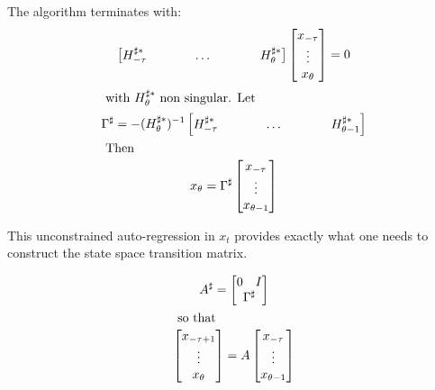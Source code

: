\documentclass{elsart}
\begin{document}

The algorithm terminates with:
\begin{gather}\label{eq:easy}
  \begin{bmatrix}
    \hsh
  \end{bmatrix} 
  \begin{bmatrix}
    x_{-\tau}\\ \vdots \\x_{\theta}
  \end{bmatrix} =0%
   \\ \intertext{ with $H^{\sharp\ast}_{\theta}$ non singular. Let} 
\Gamma^\sharp=-  (H^{\sharp\ast}_{\theta})^{-1}\begin{bmatrix}
    \hshShort
  \end{bmatrix} \\ \intertext{ Then }
x_{\theta} = 
 \Gamma^\sharp
  \begin{bmatrix}
    x_{-\tau}\\ \vdots \\x_{\theta-1}
  \end{bmatrix}  %
\end{gather}

This unconstrained auto-regression in $x_t$ provides exactly what one needs to
construct the state space transition matrix. 



\begin{gather}
A^\sharp= 
\begin{bmatrix}
  \begin{matrix}
    0&I
  \end{matrix}\\ \Gamma^\sharp
\end{bmatrix}\\ \intertext{ so that }
  \begin{bmatrix}
    x_{-\tau+1}\\ \vdots \\x_{\theta}
  \end{bmatrix}  = A
  \begin{bmatrix}
    x_{-\tau}\\ \vdots \\x_{\theta-1}
  \end{bmatrix} 
\end{gather}
\end{document}
